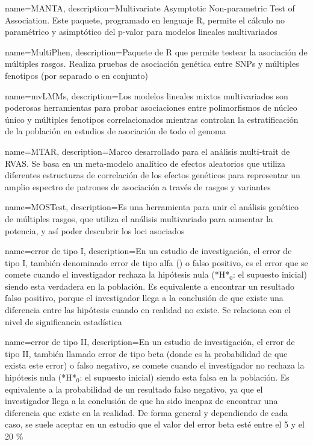   {name=MANTA,
   description={Multivariate Asymptotic Non-parametric Test of Association. Este paquete, programado en lenguaje R, permite el cálculo no paramétrico y asimptótico del p-valor para modelos lineales multivariados}
  }
  
  {name=MultiPhen,
   description={Paquete de R que permite testear la asociación de múltiples rasgos. Realiza pruebas de asociación genética entre SNPs y múltiples fenotipos (por separado o en conjunto)}
  }

  {name=mvLMMs,
   description={Los modelos lineales mixtos multivariados son poderosas herramientas para probar asociaciones entre polimorfismos de núcleo único y múltiples fenotipos correlacionados mientras controlan la estratificación de la población en estudios de asociación de todo el genoma}
  }

  {name=MTAR,
   description={Marco desarrollado para el análisis multi-trait de RVAS. Se basa en un meta-modelo analítico de efectos aleatorios que utiliza diferentes estructuras de correlación de los efectos genéticos para representar un amplio espectro de patrones de asociación a través de rasgos y variantes}
  }

  {name=MOSTest,
   description={Es una herramienta para unir el análisis genético de múltiples rasgos, que utiliza el análisis multivariado para aumentar la potencia, y así poder descubrir los loci asociados}
  }

  {name=error de tipo I,
   description={En un estudio de investigación, el error de tipo I, también denominado error de tipo alfa (\alpha) o falso positivo, es el error que se comete cuando el investigador rechaza la hipótesis nula (*H*$_{0}$: el supuesto inicial) siendo esta verdadera en la población. Es equivalente a encontrar un resultado falso positivo, porque el investigador llega a la conclusión de que existe una diferencia entre las hipótesis cuando en realidad no existe. Se relaciona con el nivel de significancia estadística}
  }

  {name=error de tipo II,
   description={En un estudio de investigación, el error de tipo II, también llamado error de tipo beta (donde \beta es la probabilidad de que exista este error) o falso negativo, se comete cuando el investigador no rechaza la hipótesis nula (*H*$_{0}$: el supuesto inicial) siendo esta falsa en la población. Es equivalente a la probabilidad de un resultado falso negativo, ya que el investigador llega a la conclusión de que ha sido incapaz de encontrar una diferencia que existe en la realidad. De forma general y dependiendo de cada caso, se suele aceptar en un estudio que el valor del error beta esté entre el 5 y el 20 \%}
  }

